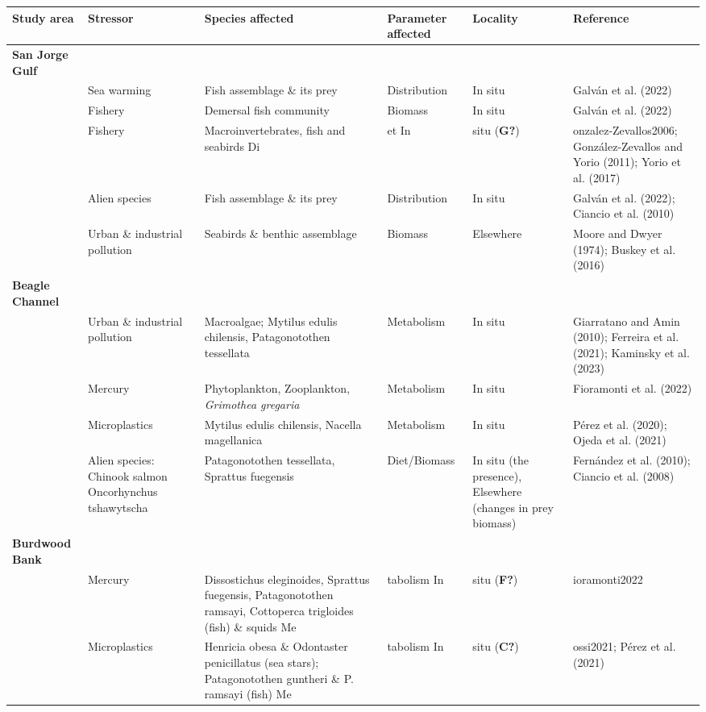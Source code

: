 \documentclass[
]{article}
\begin{document}
\begin{landscape}
\begin{longtable}{ L{2.1cm} L{2.5cm} L{4cm} L{2.5cm} L{2cm} L{3cm} }
\hline
\textbf{Study area} & \textbf{Stressor} & \textbf{Species affected} & \textbf{Parameter affected} & \textbf{Locality} & \textbf{Reference} \\
\hline
\endhead
\endfoot
\hline
\endlastfoot
\textbf{San Jorge Gulf} & & & & & \\
& Sea warming & Fish assemblage \& its prey & Distribution & In situ &
Galván et al. (2022) \\
& Fishery & Demersal fish community & Biomass & In situ & Galván et al.
(2022) \\
& Fishery & Macroinvertebrates, fish and seabirds Di & et In & situ
(\textbf{G?}) & onzalez-Zevallos2006; González-Zevallos and Yorio
(2011); Yorio et al. (2017) \\
& Alien species & Fish assemblage \& its prey & Distribution & In situ &
Galván et al. (2022); Ciancio et al. (2010) \\
& Urban \& industrial pollution & Seabirds \& benthic assemblage &
Biomass & Elsewhere & Moore and Dwyer (1974); Buskey et al. (2016) \\
\textbf{Beagle Channel} & & & & & \\
& Urban \& industrial pollution & Macroalgae; Mytilus edulis chilensis,
Patagonotothen tessellata & Metabolism & In situ & Giarratano and Amin
(2010); Ferreira et al. (2021); Kaminsky et al. (2023) \\
& Mercury & Phytoplankton, Zooplankton, \emph{Grimothea gregaria} &
Metabolism & In situ & Fioramonti et al. (2022) \\
& Microplastics & Mytilus edulis chilensis, Nacella magellanica &
Metabolism & In situ & Pérez et al. (2020); Ojeda et al. (2021) \\
& Alien species: Chinook salmon Oncorhynchus tshawytscha &
Patagonotothen tessellata, Sprattus fuegensis & Diet/Biomass & In situ
(the presence), Elsewhere (changes in prey biomass) & Fernández et al.
(2010); Ciancio et al. (2008) \\
\textbf{Burdwood Bank} & & & & & \\
& Mercury & Dissostichus eleginoides, Sprattus fuegensis, Patagonotothen
ramsayi, Cottoperca trigloides (fish) \& squids Me & tabolism In & situ
(\textbf{F?}) & ioramonti2022 \\
& Microplastics & Henricia obesa \& Odontaster penicillatus (sea stars);
Patagonotothen guntheri \& P. ramsayi (fish) Me & tabolism In & situ
(\textbf{C?}) & ossi2021; Pérez et al. (2021) \\

\end{longtable}
\end{landscape}
\end{document}
